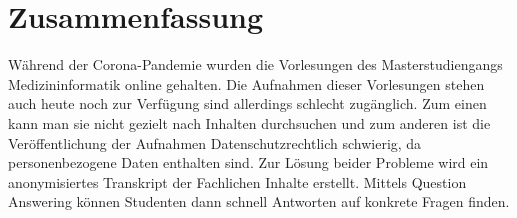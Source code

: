 \chapter*{Zusammenfassung}



Während der Corona-Pandemie wurden die Vorlesungen des Masterstudiengangs Medizininformatik online gehalten. Die Aufnahmen dieser Vorlesungen stehen auch heute noch zur Verfügung sind allerdings schlecht zugänglich. Zum einen kann man sie nicht gezielt nach Inhalten durchsuchen und zum anderen ist die Veröffentlichung der Aufnahmen Datenschutzrechtlich schwierig, da personenbezogene Daten enthalten sind. Zur Lösung beider Probleme wird ein anonymisiertes Transkript der Fachlichen Inhalte erstellt. Mittels Question Answering können Studenten dann schnell Antworten auf konkrete Fragen finden. 

\vfill